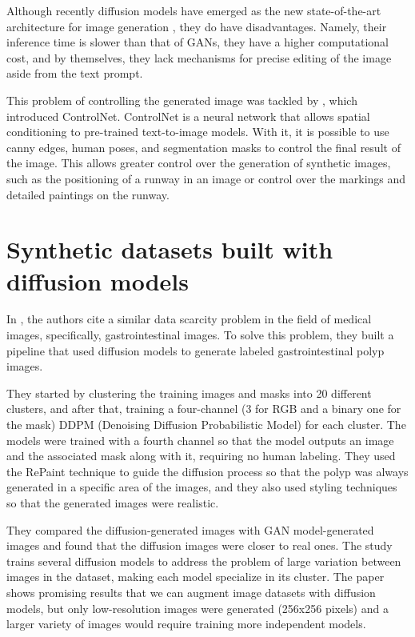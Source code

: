 Although recently diffusion models have emerged as the new state-of-the-art architecture for image generation \cite{yang_diffusion_2024}, they do have disadvantages. Namely, their inference time is slower than that of GANs, they have a higher computational cost, and by themselves, they lack mechanisms for precise editing of the image aside from the text prompt.

This problem of controlling the generated image was tackled by \cite{zhang_adding_2023}, which introduced ControlNet. ControlNet is a neural network that allows spatial conditioning to pre-trained text-to-image models. With it, it is possible to use canny edges, human poses, and segmentation masks to control the final result of the image. This allows greater control over the generation of synthetic images, such as the positioning of a runway in an image or control over the markings and detailed paintings on the runway.

\section{Synthetic datasets built with diffusion models}

In \cite{saragih_using_2024}, the authors cite a similar data scarcity problem in the field of medical images, specifically, gastrointestinal images. To solve this problem, they built a pipeline that used diffusion models to generate labeled gastrointestinal polyp images.

They started by clustering the training images and masks into 20 different clusters, and after that, training a four-channel (3 for RGB and a binary one for the mask) DDPM (Denoising Diffusion Probabilistic Model) for each cluster. The models were trained with a fourth channel so that the model outputs an image and the associated mask along with it, requiring no human labeling. They used the RePaint \cite{lugmayr_repaint_2022} technique to guide the diffusion process so that the polyp was always generated in a specific area of the images, and they also used styling techniques so that the generated images were realistic. 

They compared the diffusion-generated images with GAN model-generated images
and found that the diffusion images were closer to real ones. The study trains
several diffusion models to address the problem of large variation between
images in the dataset, making each model specialize in its cluster. The paper shows promising results that we can augment image datasets with diffusion models, but only low-resolution images were generated (256x256 pixels) and a larger variety of images would require training more independent models.

